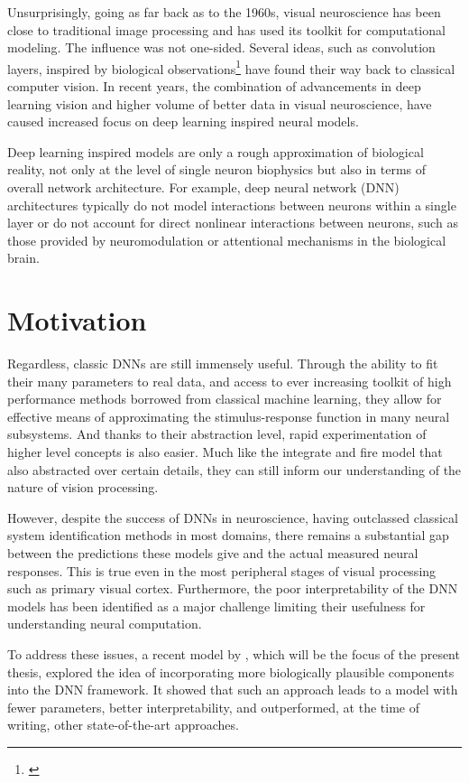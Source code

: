 Unsurprisingly, going as far back as to the 1960s, visual neuroscience has been close to traditional image processing and has used its toolkit for computational modeling. The influence was not one-sided. Several ideas, such as convolution layers, inspired by biological observations\footnote{\citep{Lindsay_2020}} have found their way back to classical computer vision. In recent years, the combination of advancements in deep learning vision and higher volume of better data in visual neuroscience, have caused increased focus on deep learning inspired neural models. 

Deep learning inspired models are only a rough approximation of biological reality, not only at the level of single neuron biophysics but also in terms of overall network architecture. For example, deep neural network (DNN) architectures typically do not model interactions between neurons within a single layer or do not account for direct nonlinear interactions between neurons, such as those provided by neuromodulation or attentional mechanisms in the biological brain. 

\section*{Motivation}
Regardless, classic DNNs are still immensely useful. Through the ability to fit their many parameters to real data, and access to ever increasing toolkit of high performance methods borrowed from classical machine learning, they allow for effective means of approximating the stimulus-response function in many neural subsystems. And thanks to their abstraction level, rapid experimentation of higher level concepts is also easier. Much like the integrate and fire model that also abstracted over certain details, they can still inform our understanding of the nature of vision processing. 

However, despite the success of DNNs in neuroscience, having outclassed classical system identification methods in most domains, there remains a substantial gap between the predictions these models give and the actual measured neural responses. This is true even in the most peripheral stages of visual processing such as primary visual cortex. Furthermore, the poor interpretability of the DNN models has been identified as a major challenge limiting their usefulness for understanding neural computation.

To address these issues, a recent model by \cite{antolik}, which will be the focus of the present thesis, explored the idea of incorporating more biologically plausible components into the DNN framework. It showed that such an approach leads to a model with fewer parameters, better interpretability, and outperformed, at the time of writing, other state-of-the-art approaches. 

